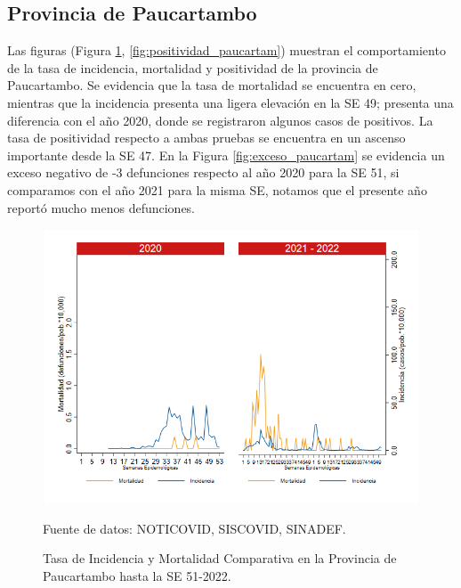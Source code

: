 \documentclass[12pt,a4paper,openany]{book}
\begin{document}
	\subsection*{Provincia de Paucartambo}
	\noindent Las figuras (Figura \ref{fig:inc_mort_paucartam}, \ref{fig:positividad_paucartam}) muestran el comportamiento de la tasa de incidencia, mortalidad y positividad de la provincia de Paucartambo. Se evidencia que la tasa de mortalidad se encuentra en cero, mientras que la incidencia presenta una ligera elevación en la SE 49; presenta una diferencia con el año 2020, donde se registraron algunos casos de positivos. La tasa de positividad respecto a ambas pruebas se encuentra en un ascenso importante desde la SE 47.
	En la Figura \ref{fig:exceso_paucartam} se evidencia un exceso negativo de -3 defunciones respecto al año 2020 para la SE 51, si comparamos con el año 2021 para la misma SE, notamos que el presente año reportó mucho menos defunciones.
	\begin{figure}[h]
		\caption{Tasa de Incidencia y Mortalidad Comparativa en la Provincia de Paucartambo hasta la SE 51-2022.}\label{fig:inc_mort_paucartam}
		\begin{center}
			\includegraphics[width=0.85\linewidth]{../figuras/incidencia_mortalidad_20_21_11.png}
		\end{center}
		{\footnotesize {Fuente de datos: NOTICOVID, SISCOVID, SINADEF.}}
	\end{figure}
	
\end{document}
